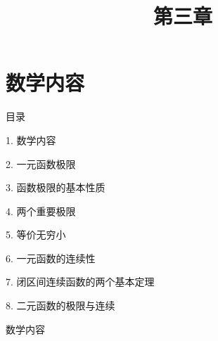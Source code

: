 \documentclass[aspectratio=169,10pt,fontset=fandol]{ctexbeamer}
\title{第三章}
\begin{document}
\section{数学内容}
\begin{frame}[t,fragile]{目录}
\normalsize
{\color{blue}\normalsize 1. 数学内容\par}\vspace{0.3em}
{\color{gray!40}\normalsize 2. 一元函数极限\par}\vspace{0.3em}
{\color{gray!40}\normalsize 3. 函数极限的基本性质\par}\vspace{0.3em}
{\color{gray!40}\normalsize 4. 两个重要极限\par}\vspace{0.3em}
{\color{gray!40}\normalsize 5. 等价无穷小\par}\vspace{0.3em}
{\color{gray!40}\normalsize 6. 一元函数的连续性\par}\vspace{0.3em}
{\color{gray!40}\normalsize 7. 闭区间连续函数的两个基本定理\par}\vspace{0.3em}
{\color{gray!40}\normalsize 8. 二元函数的极限与连续\par}\vspace{0.3em}
\end{frame}
\begin{frame}[t,fragile]{数学内容}
\normalsize
{\normalsize

\maketitle
\vspace{-1em}


}
\end{frame}
\end{document}
